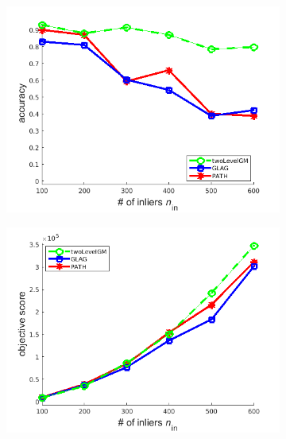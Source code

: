 \begin{figure}[h] 
		\begin{subfigure}[b]{0.3\textwidth}
			\centering
			\includegraphics[scale=0.25]{"chapter3/fig/SyntheticTest_BigGraphs/descr/Results_v4.3.3/Test2/accuracy_avg1t"} 
		\end{subfigure}
		\begin{subfigure}[b]{0.3\textwidth}
			\centering
			\includegraphics[scale=0.25]{"chapter3/fig/SyntheticTest_BigGraphs/descr/Results_v4.3.3/Test2/score_avg1t"} 
		\end{subfigure} 
		\begin{subfigure}[b]{0.3\textwidth}
			\centering

\end{subfigure}
\end{figure}
